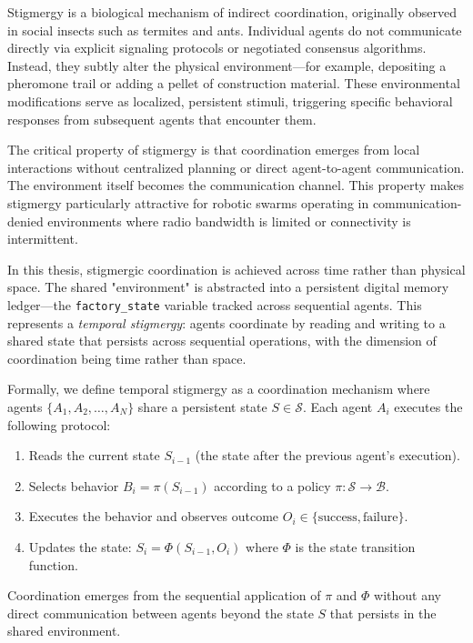 \documentclass[12pt,a4paper,oneside]{report}
\begin{document}
Stigmergy is a biological mechanism of indirect coordination, originally observed in social insects such as termites and ants. Individual agents do not communicate directly via explicit signaling protocols or negotiated consensus algorithms. Instead, they subtly alter the physical environment—for example, depositing a pheromone trail or adding a pellet of construction material. These environmental modifications serve as localized, persistent stimuli, triggering specific behavioral responses from subsequent agents that encounter them.

The critical property of stigmergy is that coordination emerges from local interactions without centralized planning or direct agent-to-agent communication. The environment itself becomes the communication channel. This property makes stigmergy particularly attractive for robotic swarms operating in communication-denied environments where radio bandwidth is limited or connectivity is intermittent.

In this thesis, stigmergic coordination is achieved across time rather than physical space. The shared "environment" is abstracted into a persistent digital memory ledger—the \texttt{factory\_state} variable tracked across sequential agents. This represents a \textit{temporal stigmergy}: agents coordinate by reading and writing to a shared state that persists across sequential operations, with the dimension of coordination being time rather than space.

Formally, we define temporal stigmergy as a coordination mechanism where agents $\{A_1, A_2, \ldots, A_N\}$ share a persistent state $S \in \mathcal{S}$. Each agent $A_i$ executes the following protocol:

\begin{enumerate}
    \item Reads the current state $S_{i-1}$ (the state after the previous agent's execution).
    \item Selects behavior $B_i = \pi(S_{i-1})$ according to a policy $\pi: \mathcal{S} \rightarrow \mathcal{B}$.
    \item Executes the behavior and observes outcome $O_i \in \{\text{success}, \text{failure}\}$.
    \item Updates the state: $S_i = \Phi(S_{i-1}, O_i)$ where $\Phi$ is the state transition function.
\end{enumerate}

Coordination emerges from the sequential application of $\pi$ and $\Phi$ without any direct communication between agents beyond the state $S$ that persists in the shared environment.
\end{document}
